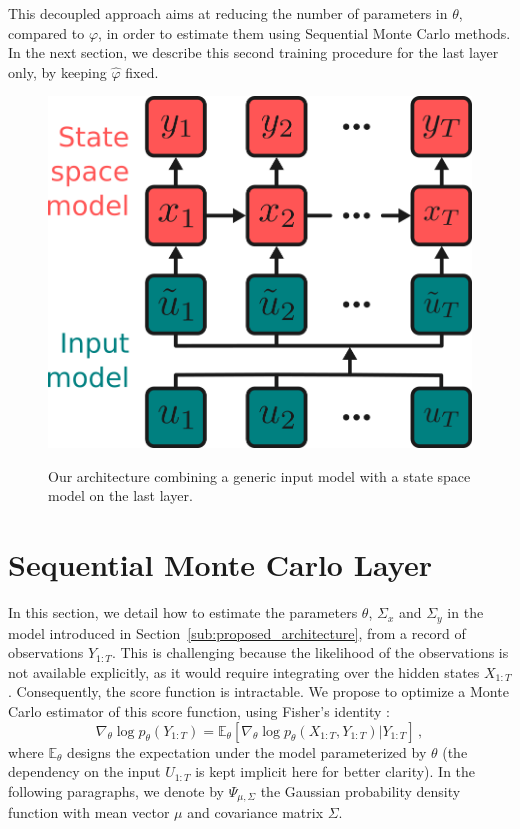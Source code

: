\documentclass[conference]{IEEEtran}
\begin{document}
This decoupled approach aims at reducing the number of parameters in $\theta$, compared to $\varphi$, in order to estimate them using Sequential Monte Carlo methods.
In the next section, we describe this second training procedure for the last layer only, by keeping $\hat \varphi$ fixed.

\begin{figure}[htpb]
	\centering
	\caption{Our architecture combining a generic input model with a state space model on the last layer.}
	\includegraphics[width=0.5\linewidth]{architecture.png}
	\label{fig:architecture}
\end{figure}

\section{Sequential Monte Carlo Layer}%
\label{sub:uncertainty_estimation}
In this section, we detail how to estimate the parameters $\theta$, $\Sigma_x$ and $\Sigma_y$ in the model introduced in Section~\ref{sub:proposed_architecture}, from a record of observations $Y_{1:T}$.
This is challenging because the likelihood of the observations is not available explicitly, as it would require integrating over the hidden states $X_{1:T}$.
Consequently, the score function is intractable.
We propose to optimize a Monte Carlo estimator of this score function, using Fisher's identity \cite{monographie-randal}:
\begin{equation}
	\nabla_\theta \log p_\theta(Y_{1:T}) = \mathbb{E}_\theta \left[ \nabla_\theta\log p_\theta(X_{1:T}, Y_{1:T}) | Y_{1:T} \right]\,,
	\label{eq:grad_ll}
\end{equation}
where $\mathbb{E}_\theta$ designs the expectation under the model parameterized by $\theta$ (the dependency on the input $U_{1:T}$ is kept implicit here for better clarity).
In the following paragraphs, we denote by $\Psi_{\mu, \Sigma}$ the Gaussian probability density function with mean vector $\mu$ and covariance matrix $\Sigma$.
\end{document}

